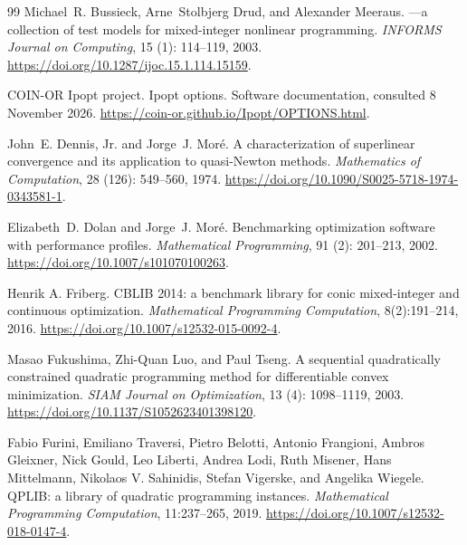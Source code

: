 \documentclass[pdflatex,sn-mathphys-num]{sn-jnl}
\theoremstyle{thmstyleone}
\theoremstyle{thmstylethree}
\begin{document}
\begin{thebibliography}{99}
Michael~R. Bussieck, Arne~Stolbjerg Drud, and Alexander Meeraus.
---a collection of test models for mixed-integer nonlinear
  programming.
\newblock \emph{INFORMS Journal on Computing}, 15 (1):
  114--119, 2003.
\newblock \url{https://doi.org/10.1287/ijoc.15.1.114.15159}.

COIN-OR Ipopt project.
\newblock Ipopt options.
\newblock Software documentation, consulted 8 November 2026.
\newblock \url{https://coin-or.github.io/Ipopt/OPTIONS.html}.

John~E. Dennis, Jr. and Jorge~J. Mor{\'e}.
\newblock A characterization of superlinear convergence and its application to
  quasi-{Newton} methods.
\newblock \emph{Mathematics of Computation}, 28 (126):
  549--560, 1974.
\newblock \url{https://doi.org/10.1090/S0025-5718-1974-0343581-1}.

Elizabeth~D. Dolan and Jorge~J. Mor{\'e}.
\newblock Benchmarking optimization software with performance profiles.
\newblock \emph{Mathematical Programming}, 91 (2): 201--213,
  2002.
\newblock \url{https://doi.org/10.1007/s101070100263}.

Henrik A. Friberg.
\newblock CBLIB 2014: a benchmark library for conic mixed-integer and continuous optimization.
\newblock \emph{Mathematical Programming Computation}, 8(2):191--214, 2016.
\newblock \url{https://doi.org/10.1007/s12532-015-0092-4}.

Masao Fukushima, Zhi-Quan Luo, and Paul Tseng.
\newblock A sequential quadratically constrained quadratic programming method
  for differentiable convex minimization.
\newblock \emph{SIAM Journal on Optimization}, 13 (4):
  1098--1119, 2003.
\newblock \url{https://doi.org/10.1137/S1052623401398120}.

Fabio Furini, Emiliano Traversi, Pietro Belotti, Antonio Frangioni, Ambros Gleixner,
Nick Gould, Leo Liberti, Andrea Lodi, Ruth Misener, Hans Mittelmann,
Nikolaos V. Sahinidis, Stefan Vigerske, and Angelika Wiegele.
\newblock QPLIB: a library of quadratic programming instances.
\newblock \emph{Mathematical Programming Computation}, 11:237--265, 2019.
\newblock \url{https://doi.org/10.1007/s12532-018-0147-4}.


\end{thebibliography}
\end{document}
